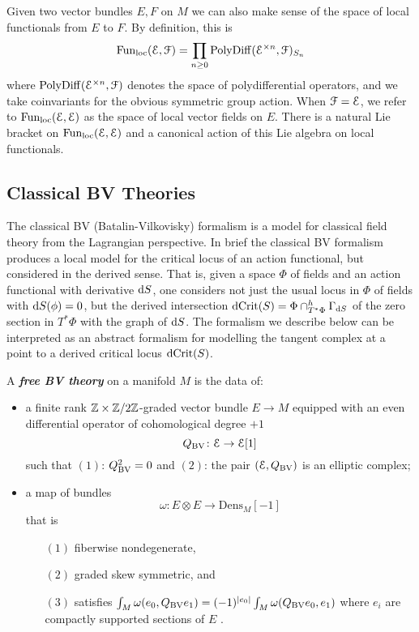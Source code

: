 \documentclass[10pt, oneside]{article}
\newcommand{\Dens}{\mathrm{Dens}}
\newcommand{\defterm}[1]{\textbf{\emph{#1}}}
\begin{document}
Given two vector bundles $E, F$ on $M$ we can also make sense of the space of local functionals from $E$ to $F$.
By definition, this is 
\[
{\rm Fun}_{\rm loc}(\mathcal E, \mathcal F) = \prod_{n \geq 0} {\rm PolyDiff}(\mathcal E^{\times n}, \mathcal F)_{S_n}
\]
where ${\rm PolyDiff}(\mathcal E^{\times n}, \mathcal F)$ denotes the space of polydifferential operators, and we take coinvariants for the obvious symmetric group action.
When $\mathcal F = \mathcal E$, we refer to ${\rm Fun}_{\rm loc}(\mathcal E, \mathcal E)$ as the space of local vector fields on $E$. 
There is a natural Lie bracket on ${\rm Fun}_{\rm loc}(\mathcal E, \mathcal E)$ and a canonical action of this Lie algebra on local functionals. 

\subsection{Classical BV Theories}


The classical BV (Batalin-Vilkovisky) formalism \cite{BatalinVilkovisky} is a model for classical field theory from the Lagrangian perspective.  In brief the classical BV formalism produces a local model for the critical locus of an action functional, but considered in the derived sense.  That is, given a space $\Phi$ of fields and an action functional with derivative ${\rm d} S$, one considers not just the usual locus in $\Phi$ of fields with ${\rm d} S(\phi) = 0$, but the derived intersection $\mathrm{dCrit}(S) = \Phi \cap^h_{T^*\Phi} \Gamma_{{\rm d} S}$ of the zero section in $T^*\Phi$ with the graph of ${\rm d} S$.  The formalism we describe below can be interpreted as an abstract formalism for modelling the tangent complex at a point to a derived critical locus $\mathrm{dCrit}(S)$.

\begin{definition}
A \defterm{free BV theory} on a manifold $M$ is the data of:
\begin{itemize}
\item a finite rank $\mathbb Z\times\mathbb Z/2\mathbb Z$-graded vector bundle $E \to M$ equipped with an even differential operator of cohomological degree $+1$
\[
Q_{\mathrm{BV}} \colon \mathcal E \to \mathcal E [1] 
\]
such that $(1)$: $Q_{\mathrm{BV}}^2 = 0$ and $(2)$: the pair $(\mathcal E , Q_{\mathrm{BV}})$ is an elliptic complex;
\item a map of bundles
\[
\omega\colon E \otimes E \to \Dens_M [-1]
\]
that is
\begin{enumerate}
\item[$(1)$] fiberwise nondegenerate,
\item[$(2)$] graded skew symmetric, and
\item[$(3)$] satisfies $\int_M \omega(e_0, Q_{\mathrm{BV}} e_1) = (-1)^{|e_0|} \int_M \omega(Q_{\mathrm{BV}} e_0, e_1)$ where $e_i$ are compactly supported sections of $E$ .
\end{enumerate}
\end{itemize}
\end{definition}
\end{document}
